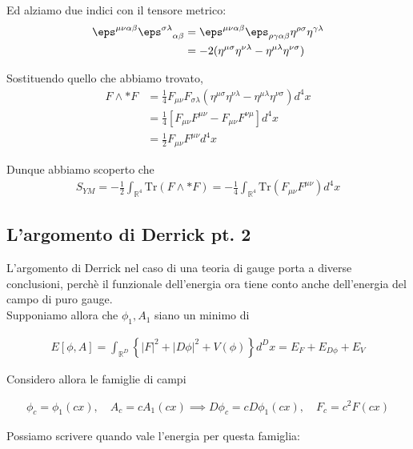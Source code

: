 \documentclass{report}
\begin{document}
{    Ed alziamo due indici con il tensore metrico: 
    \begin{align}
        \eps^{\mu\nu\alpha\beta}\eps^{\sigma\lambda}_{\quad \alpha\beta} &= \eps^{\mu\nu\alpha\beta}\eps_{\rho\gamma\alpha\beta}\eta^{\rho\sigma}\eta^{\gamma\lambda} \\
        &= -2(\eta^{\mu\sigma}\eta^{\nu\lambda} - \eta^{\mu\lambda}\eta^{\nu\sigma})
    \end{align}

    Sostituendo quello che abbiamo trovato, 
    \begin{align}
        F \wedge *F &= \frac{1}{4}F_{\mu\nu}F_{\sigma\lambda}(\eta^{\mu\sigma}\eta^{\nu\lambda} - \eta^{\mu\lambda}\eta^{\nu\sigma})d^4x \\
        &= \frac{1}{4}[F_{\mu\nu}F^{\mu\nu}-F_{\mu\nu}F^{\nu\mu}]d^4x \\
        &= \frac{1}{2}F_{\mu\nu}F^{\mu\nu}d^4x
    \end{align}

    Dunque abbiamo scoperto che 
    \begin{align}
        S_{YM} = -\frac{1}{2}\int_{\mathbb{R}^4}\text{Tr}(F\wedge *F) = -\frac{1}{4}\int_{\mathbb{R}^4}\text{Tr}(F_{\mu\nu}F^{\mu\nu})d^4x
    \end{align}
}

\subsection{L'argomento di Derrick pt. 2}

L'argomento di Derrick nel caso di una teoria di gauge porta a diverse conclusioni, perchè il funzionale dell'energia ora tiene conto anche dell'energia del campo di puro gauge. \\

Supponiamo allora che \(\phi_1, A_1\) siano un minimo di 

\begin{align}
    E[\phi, A] = \int_{\mathbb{R}^D}\left\{|F|^2 + |D\phi|^2 + V(\phi)\right\}d^Dx = E_{F} + E_{D\phi} + E_V
\end{align}

Considero allora le famiglie di campi 

\begin{align}
    \phi_c = \phi_1 (cx), \quad A_c = cA_1 (cx) \implies D\phi_c = cD\phi_1 (cx), \quad F_c = c^2 F(cx)  
\end{align}

Possiamo scrivere quando vale l'energia per questa famiglia: 
\end{document}
